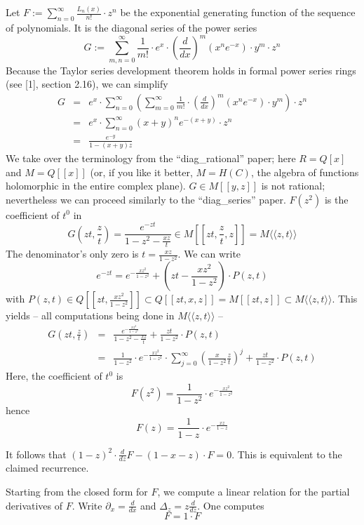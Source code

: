 \documentclass[12pt,a4paper,oneside,onecolumn]{article}
\def\ll{\langle\!\langle}
\def\gg{\rangle\!\rangle}
\begin{document}
Let  \( F:=\sum ^{\infty }_{n=0}\frac{L_{n}(x)}{n!}\cdot z^{n} \) be the exponential generating function of the sequence of polynomials.
It is the diagonal series of the power series
\[
G:=\sum _{m,n=0}^{\infty }\frac{1}{m!}\cdot e^{x}\cdot \left( \frac{d}{dx}\right) ^{m}(x^{n}e^{-x})\cdot y^{m}\cdot z^{n}\]
Because the Taylor series
development theorem holds in formal power series rings (see [1], section
2.16), we can simplify
\begin{eqnarray*}
G & = & e^{x}\cdot \sum _{n=0}^{\infty }\left( \sum _{m=0}^{\infty }\frac{1}{m!}\cdot \left( \frac{d}{dx}\right) ^{m}(x^{n}e^{-x})\cdot y^{m}\right) \cdot z^{n}\\
 & = & e^{x}\cdot \sum _{n=0}^{\infty }(x+y)^{n}e^{-(x+y)}\cdot z^{n}\\
 & = & \frac{e^{-y}}{1-(x+y)z}
\end{eqnarray*}
We take over the terminology from the ``diag\_rational''
paper; here  \( R=Q[x] \) and  \( M=Q[[x]] \) (or, if you like it better,  \( M=H(C) \), the algebra of
functions holomorphic in the entire complex plane).  \( G\in M[[y,z]] \) is not rational;
nevertheless we can proceed similarly to the ``diag\_series'' paper.
 \( F(z^{2}) \) is the coefficient of  \( t^{0} \) in
\[
G(zt,\frac{z}{t})=\frac{e^{-zt}}{1-z^{2}-\frac{xz}{t}}\in M[[zt,\frac{z}{t},z]]=M\ll z,t\gg \]
The denominator's only zero is  \( t=\frac{xz}{1-z^{2}} \). We
can write
\[
e^{-zt}=e^{-\frac{xz^{2}}{1-z^{2}}}+\left( zt-\frac{xz^{2}}{1-z^{2}}\right) \cdot P(z,t)\]
with  \( P(z,t)\in Q[[zt,\frac{xz^{2}}{1-z^{2}}]]\subset Q[[zt,x,z]]=M[[zt,z]]\subset M\ll z,t\gg  \). This yields -- all computations being done in  \( M\ll z,t\gg  \)
--
\begin{eqnarray*}
G(zt,\frac{z}{t}) & = & \frac{e^{-\frac{xz^{2}}{1-z^{2}}}}{1-z^{2}-\frac{xz}{t}}+\frac{zt}{1-z^{2}}\cdot P(z,t)\\
 & = & \frac{1}{1-z^{2}}\cdot e^{-\frac{xz^{2}}{1-z^{2}}}\cdot \sum _{j=0}^{\infty }\left( \frac{x}{1-z^{2}}\frac{z}{t}\right) ^{j}+\frac{zt}{1-z^{2}}\cdot P(z,t)
\end{eqnarray*}
Here, the coefficient of  \( t^{0} \) is
\[
F(z^{2})=\frac{1}{1-z^{2}}\cdot e^{-\frac{xz^{2}}{1-z^{2}}}\]
hence
\[
F(z)=\frac{1}{1-z}\cdot e^{-\frac{xz}{1-z}}\]


It follows that  \( (1-z)^{2}\cdot \frac{d}{dz}F-(1-x-z)\cdot F=0 \). This is equivalent to the claimed recurrence.

Starting from the closed form for  \( F \), we compute a linear relation
for the partial derivatives of  \( F \). Write  \( \partial _{x}=\frac{d}{dx} \) and  \( \Delta _{z}=z\frac{d}{dz} \). One computes
\[
F=1\cdot F\]
\end{document}
